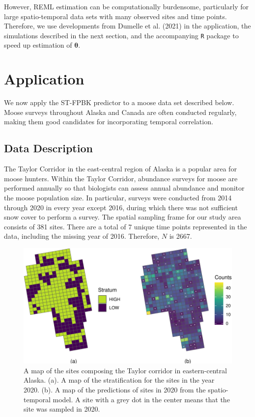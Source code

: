 \documentclass[]{article}    %
\begin{document}
However, REML estimation can be computationally burdensome, particularly
for large spatio-temporal data sets with many observed sites and time
points. Therefore, we use developments from Dumelle et al. (2021) in the
application, the simulations described in the next section, and the
accompanying \texttt{R} package to speed up estimation of
\(\bm{\theta}\).

\hypertarget{section:Application}{%
\section{Application}\label{section:Application}}

We now apply the ST-FPBK predictor to a moose data set described below.
Moose surveys throughout Alaska and Canada are often conducted
regularly, making them good candidates for incorporating temporal
correlation.

\hypertarget{data-description}{%
\subsection{Data Description}\label{data-description}}

The Taylor Corridor in the east-central region of Alaska is a popular
area for moose hunters. Within the Taylor Corridor, abundance surveys
for moose are performed annually so that biologists can assess annual
abundance and monitor the moose population size. In particular, surveys
were conducted from 2014 through 2020 in every year except 2016, during
which there was not sufficient snow cover to perform a survey. The
spatial sampling frame for our study area consists of 381 sites. There
are a total of 7 unique time points represented in the data, including
the missing year of 2016. Therefore, \(N\) is 2667.

\begin{figure}
\centering
\includegraphics{area_map.pdf}
\caption{\label{fig:sitepredmap} A map of the sites composing the Taylor
corridor in eastern-central Alaska. (a). A map of the stratification for
the sites in the year 2020. (b). A map of the predictions of sites in
2020 from the spatio-temporal model. A site with a grey dot in the
center means that the site was sampled in 2020.}
\end{figure}
\end{document}
